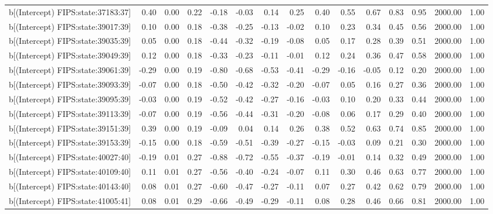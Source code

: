 \begin{table}[ht]
\begin{tabular}{rrrrrrrrrrrrrrr}
  b[(Intercept) FIPS:state:37183:37] & 0.40 & 0.00 & 0.22 & -0.18 & -0.03 & 0.14 & 0.25 & 0.40 & 0.55 & 0.67 & 0.83 & 0.95 & 2000.00 & 1.00 \\ 
  b[(Intercept) FIPS:state:39017:39] & 0.10 & 0.00 & 0.18 & -0.38 & -0.25 & -0.13 & -0.02 & 0.10 & 0.23 & 0.34 & 0.45 & 0.56 & 2000.00 & 1.00 \\ 
  b[(Intercept) FIPS:state:39035:39] & 0.05 & 0.00 & 0.18 & -0.44 & -0.32 & -0.19 & -0.08 & 0.05 & 0.17 & 0.28 & 0.39 & 0.51 & 2000.00 & 1.00 \\ 
  b[(Intercept) FIPS:state:39049:39] & 0.12 & 0.00 & 0.18 & -0.33 & -0.23 & -0.11 & -0.01 & 0.12 & 0.24 & 0.36 & 0.47 & 0.58 & 2000.00 & 1.00 \\ 
  b[(Intercept) FIPS:state:39061:39] & -0.29 & 0.00 & 0.19 & -0.80 & -0.68 & -0.53 & -0.41 & -0.29 & -0.16 & -0.05 & 0.12 & 0.20 & 2000.00 & 1.00 \\ 
  b[(Intercept) FIPS:state:39093:39] & -0.07 & 0.00 & 0.18 & -0.50 & -0.42 & -0.32 & -0.20 & -0.07 & 0.05 & 0.16 & 0.27 & 0.36 & 2000.00 & 1.00 \\ 
  b[(Intercept) FIPS:state:39095:39] & -0.03 & 0.00 & 0.19 & -0.52 & -0.42 & -0.27 & -0.16 & -0.03 & 0.10 & 0.20 & 0.33 & 0.44 & 2000.00 & 1.00 \\ 
  b[(Intercept) FIPS:state:39113:39] & -0.07 & 0.00 & 0.19 & -0.56 & -0.44 & -0.31 & -0.20 & -0.08 & 0.06 & 0.17 & 0.29 & 0.40 & 2000.00 & 1.00 \\ 
  b[(Intercept) FIPS:state:39151:39] & 0.39 & 0.00 & 0.19 & -0.09 & 0.04 & 0.14 & 0.26 & 0.38 & 0.52 & 0.63 & 0.74 & 0.85 & 2000.00 & 1.00 \\ 
  b[(Intercept) FIPS:state:39153:39] & -0.15 & 0.00 & 0.18 & -0.59 & -0.51 & -0.39 & -0.27 & -0.15 & -0.03 & 0.09 & 0.21 & 0.30 & 2000.00 & 1.00 \\ 
  b[(Intercept) FIPS:state:40027:40] & -0.19 & 0.01 & 0.27 & -0.88 & -0.72 & -0.55 & -0.37 & -0.19 & -0.01 & 0.14 & 0.32 & 0.49 & 2000.00 & 1.00 \\ 
  b[(Intercept) FIPS:state:40109:40] & 0.11 & 0.01 & 0.27 & -0.56 & -0.40 & -0.24 & -0.07 & 0.11 & 0.30 & 0.46 & 0.63 & 0.77 & 2000.00 & 1.00 \\ 
  b[(Intercept) FIPS:state:40143:40] & 0.08 & 0.01 & 0.27 & -0.60 & -0.47 & -0.27 & -0.11 & 0.07 & 0.27 & 0.42 & 0.62 & 0.79 & 2000.00 & 1.00 \\ 
  b[(Intercept) FIPS:state:41005:41] & 0.08 & 0.01 & 0.29 & -0.66 & -0.49 & -0.29 & -0.11 & 0.08 & 0.28 & 0.46 & 0.66 & 0.81 & 2000.00 & 1.00 \\ 

\end{tabular}
\end{table}
